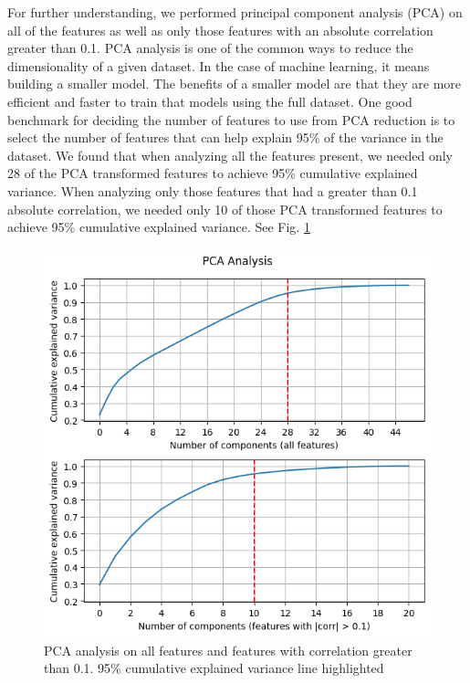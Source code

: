 \documentclass[journal]{IEEEtran}
\begin{document}
For further understanding, we performed principal component analysis (PCA) on all of the features as well as only those features with an absolute correlation greater than 0.1. PCA analysis is one of the common ways to reduce the dimensionality of a given dataset. In the case of machine learning, it means building a smaller model. The benefits of a smaller model are that they are more efficient and faster to train that models using the full dataset. One good benchmark for deciding the number of features to use from PCA reduction is to select the number of features that can help explain 95\% of the variance in the dataset. We found that when analyzing all the features present, we needed only 28 of the PCA transformed features to achieve 95\% cumulative explained variance. When analyzing only those features that had a greater than 0.1 absolute correlation, we needed only 10 of those PCA transformed features to achieve 95\% cumulative explained variance. See Fig. \ref{fig:pca-all} 

\begin{figure}[!htb]
    \centering
    \includegraphics[width=1\linewidth]{figures//uploads/pca.png}
    \caption{PCA analysis on all features and features with correlation greater than 0.1. 95\% cumulative explained variance line highlighted}
    \label{fig:pca-all}
\end{figure}
\end{document}
